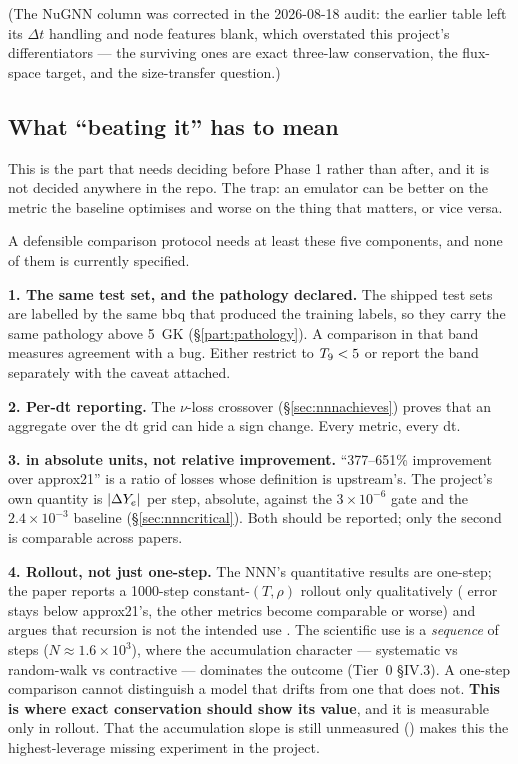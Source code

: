 (The NuGNN column was corrected in the 2026-08-18 audit: the earlier table left
its $\Delta t$ handling and node features blank, which overstated this
project's differentiators --- the surviving ones are exact three-law
conservation, the flux-space target, and the size-transfer question.)

\subsection{What ``beating it'' has to mean}
\label{sec:beating}

This is the part that needs deciding before Phase 1 rather than after, and it
is not decided anywhere in the repo. The trap: an emulator can be better on the
metric the baseline optimises and worse on the thing that matters, or vice
versa.

A defensible comparison protocol needs at least these five components, and none
of them is currently specified.

\textbf{1. The same test set, and the pathology declared.} The shipped test
sets are labelled by the same bbq that produced the training labels, so they
carry the same pathology above 5~GK (\S\ref{part:pathology}). A comparison in
that band measures agreement with a bug. Either restrict to $T_{9} < 5$ or report
the band separately with the caveat attached.

\textbf{2. Per-dt reporting.} The $\nu$-loss crossover
(\S\ref{sec:nnnachieves}) proves that an aggregate over the dt grid can hide a
sign change. Every metric, every dt.

\textbf{3. \Ye{} in absolute units, not relative improvement.} ``377--651\%
improvement over approx21'' is a ratio of losses whose definition is
upstream's. The project's own quantity is $|\Delta Y_{e}|$ per step, absolute, against
the $3 \times 10^{-6}$ gate and the $2.4 \times 10^{-3}$ baseline
(\S\ref{sec:nnncritical}). Both should be reported; only the second is
comparable across papers.

\textbf{4. Rollout, not just one-step.} The NNN's quantitative results are
one-step; the paper reports a 1000-step constant-$(T, \rho)$ rollout only
qualitatively (\Ye{} error stays below approx21's, the other metrics become
comparable or worse) and argues that recursion is not the intended use
\citep[\S 4]{grichener2025}. The scientific use is a \emph{sequence} of steps
($N \approx 1.6 \times 10^3$), where the accumulation character --- systematic
vs random-walk vs contractive --- dominates the outcome (Tier~0 \S IV.3). A
one-step comparison cannot distinguish a model that drifts from one that does
not. \textbf{This is where exact conservation should show its value}, and it
is measurable only in rollout. That the accumulation slope is still unmeasured
() makes this the highest-leverage missing experiment in
the project.

